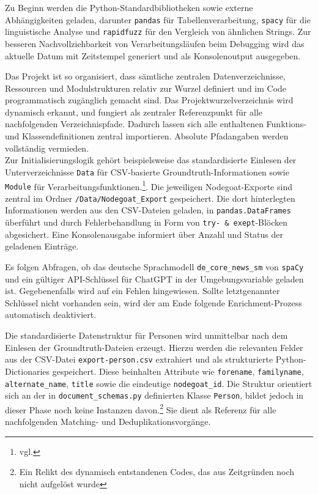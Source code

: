\documentclass[12pt, a4paper, ngerman, bidi=default]{article}
\newcommand{\code}[1]{\colorbox{VeryLightGray}{\texttt{#1}}} %
\begin{document}
Zu Beginn werden die Python-Standardbibliotheken sowie externe Abhängigkeiten geladen, darunter \code{pandas} für 
Tabellenverarbeitung, \code{spacy} für die linguistische Analyse und \code{rapidfuzz} für den Vergleich von ähnlichen Strings. Zur besseren Nachvollziehbarkeit von
Verarbeitungsläufen beim Debugging wird das aktuelle Datum mit Zeitstempel generiert und als Konsolenoutput ausgegeben. 

Das Projekt ist so organisiert, dass sämtliche zentralen Datenverzeichnisse, Ressourcen und Modulstrukturen relativ
zur Wurzel definiert und im Code programmatisch zugänglich gemacht sind. Das Projektwurzelverzeichnis wird dynamisch erkannt, und fungiert als zentraler Referenzpunkt für alle nachfolgenden Verzeichnispfade. Dadurch lassen sich alle enthaltenen Funktions- und Klassendefinitionen zentral importieren. Absolute Pfadangaben werden vollständig vermieden.\\

Zur Initialisierungslogik gehört  beispielsweise das standardisierte Einlesen der 
Unterverzeichnisse \code{Data} für CSV-basierte Groundtruth-Informationen sowie \code{Module} für Verarbeitungsfunktionen.\footnote{vgl. }. Die jeweiligen Nodegoat-Exporte sind zentral im Ordner \code{/Data/Nodegoat\_Export} gespeichert. 
Die dort hinterlegten Informationen werden aus den 
CSV-Dateien geladen, in \code{pandas.DataFrames} überführt und durch Fehlerbehandlung in Form von
\code{try- \& exept}-Blöcken abgesichert. 
Eine Konsolenausgabe informiert über Anzahl und Status der geladenen Einträge.

Es folgen Abfragen, ob  das deutsche Sprachmodell 
\code{de\_core\_news\_sm} von \code{spaCy} und ein gültiger API-Schlüssel für ChatGPT in der Umgebungsvariable geladen ist. Gegebenenfalls wird auf ein Fehlen hingewiesen. Sollte letztgenannter Schlüssel nicht vorhanden sein, wird der am Ende folgende Enrichment-Prozess automatisch deaktiviert.

Die standardisierte Datenstruktur für Personen wird unmittelbar nach dem Einlesen der 
Groundtruth-Dateien erzeugt. Hierzu werden die relevanten Felder aus der CSV-Datei 
\code{export-person.csv} extrahiert und als strukturierte Python-Dictionaries gespeichert. 
Diese beinhalten Attribute wie \code{forename}, \code{familyname}, \code{alternate\_name}, 
\code{title} sowie die eindeutige \code{nodegoat\_id}. Die Struktur orientiert sich an der in 
\code{document\_schemas.py} definierten Klasse \code{Person}, bildet jedoch in dieser Phase noch 
keine Instanzen davon.\footnote{Ein Relikt des dynamisch entstandenen Codes, das aus Zeitgründen noch nicht aufgelöst wurde} Sie dient als Referenz für alle nachfolgenden Matching- und 
Deduplikationsvorgänge.
\end{document}
